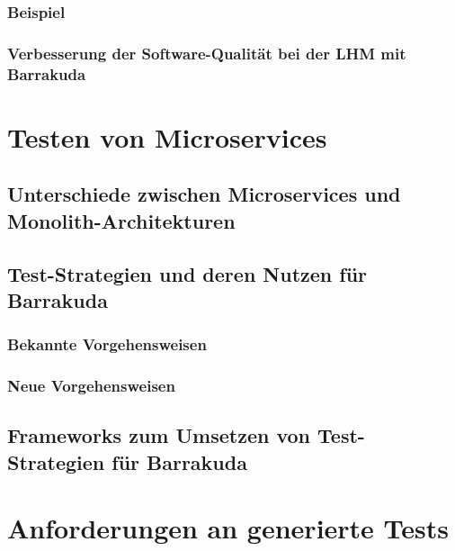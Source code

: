 \documentclass[12pt,a4paper,bibliography=totocnumbered,listof=totocnumbered]{scrartcl}
\begin{document}
\subsubsection{Beispiel}

\subsubsection{Verbesserung der Software-Qualität bei der LHM mit Barrakuda}


\section{Testen von Microservices}

\subsection{Unterschiede zwischen Microservices und Monolith-Architekturen}

\subsection{Test-Strategien und deren Nutzen für Barrakuda}

\subsubsection{Bekannte Vorgehensweisen}

\subsubsection{Neue Vorgehensweisen}

\subsection{Frameworks zum Umsetzen von Test-Strategien für Barrakuda}

\section{Anforderungen an generierte Tests}
\end{document}
